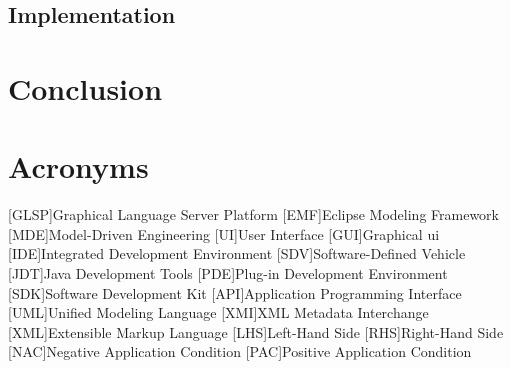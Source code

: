 \documentclass[conference,onecolumn]{IEEEtran}
\begin{document}
  \subsection{Implementation}
  \label{subsec:implementation}


  \section{Conclusion}

  \printbibliography

  \newpage
  \section{Acronyms}
  \label{sec:acronyms}

  \begin{acronym}
    [GLSP]{Graphical Language Server Platform}
    [EMF]{Eclipse Modeling Framework}
    [MDE]{Model-Driven Engineering}
    [UI]{User Interface}
    [GUI]{Graphical \acf{ui}}
    [IDE]{Integrated Development Environment}
    [SDV]{Software-Defined Vehicle}
    [JDT]{Java Development Tools}
    [PDE]{Plug-in Development Environment}
    [SDK]{Software Development Kit}
    [API]{Application Programming Interface}
    [UML]{Unified Modeling Language}
    [XMI]{XML Metadata Interchange}
    [XML]{Extensible Markup Language}
    [LHS]{Left-Hand Side}
    [RHS]{Right-Hand Side}
    [NAC]{Negative Application Condition}
    [PAC]{Positive Application Condition}
    
  \end{acronym}
\end{document}
